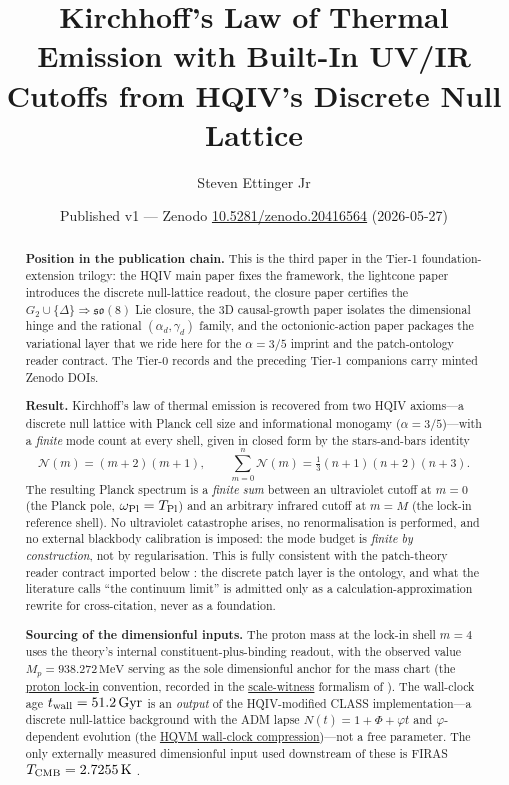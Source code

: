 \documentclass[11pt]{amsart}
\title[Finite-Mode Kirchhoff from HQIV]
{Kirchhoff's Law of Thermal Emission with Built-In UV/IR Cutoffs
from HQIV's Discrete Null Lattice}
\author{Steven Ettinger Jr}
\date{Published v1 --- Zenodo \href{https://doi.org/10.5281/zenodo.20416564}{10.5281/zenodo.20416564} (2026-05-27)}
\begin{document}
\begin{abstract}
\noindent\textbf{Position in the publication chain.}
This is the third paper in the Tier-1 foundation-extension trilogy:
the HQIV main paper \cite{ettinger2026hqiv} fixes the framework, the
lightcone paper \cite{hqiv-lightcone-paper} introduces the discrete
null-lattice readout, the closure paper \cite{hqiv-so8-paper}
certifies the $G_2\cup\{\Delta\}\Rightarrow\mathfrak{so}(8)$ Lie
closure, the 3D causal-growth paper \cite{hqiv-3d-growth-paper}
isolates the dimensional hinge and the rational \((\alpha_d,\gamma_d)\)
family, and the octonionic-action paper \cite{hqiv-oct-action-paper}
packages the variational layer that we ride here for the
$\alpha=3/5$ imprint and the patch-ontology reader contract. The
Tier-0 records and the preceding Tier-1 companions
\cite{hqiv-3d-growth-paper,hqiv-oct-action-paper} carry minted Zenodo DOIs.

\noindent\textbf{Result.}
Kirchhoff's law of thermal emission is recovered from two HQIV
axioms---a discrete null lattice with Planck cell size and
informational monogamy ($\alpha=3/5$)---with a \emph{finite} mode
count at every shell, given in closed form by the stars-and-bars
identity
\[
  \mathcal{N}(m)=(m+2)(m+1),
\qquad
  \sum_{m=0}^{n}\mathcal{N}(m)=\tfrac{1}{3}(n+1)(n+2)(n+3).
\]
The resulting Planck spectrum is a \emph{finite sum} between an
ultraviolet cutoff at $m=0$ (the Planck pole, $\omega_{\rm Pl}=T_{\rm Pl}$)
and an arbitrary infrared cutoff at $m=M$ (the lock-in reference
shell).  No ultraviolet catastrophe arises, no renormalisation is
performed, and no external blackbody calibration is imposed: the
mode budget is \emph{finite by construction}, not by regularisation.
This is fully consistent with the patch-theory reader contract
imported below \cite{hqiv-oct-action-paper}: the discrete patch
layer is the ontology, and what the literature calls ``the
continuum limit'' is admitted only as a calculation-approximation
rewrite for cross-citation, never as a foundation.

\noindent\textbf{Sourcing of the dimensionful inputs.}
The proton mass at the lock-in shell $m=4$ uses the theory's
internal constituent-plus-binding readout, with the observed
value $M_{p}=938.272\,\mathrm{MeV}$ serving as the
sole dimensionful anchor for the mass chart (the
\hyperref[lean:proton-lockin]{proton lock-in} convention, recorded in
the \hyperref[lean:scale-witness]{scale-witness} formalism of
\cite{hqiv-lean}).
The wall-clock age $t_{\rm wall}=51.2\,\mathrm{Gyr}$ is an
\emph{output} of the HQIV-modified CLASS implementation---a
discrete null-lattice background with the ADM lapse
$N(t)=1+\Phi+\varphi t$ and $\varphi$-dependent evolution (the
\hyperref[lean:wall-clock]{HQVM wall-clock compression})---not a
free parameter.  The only externally measured dimensionful input
used downstream of these is FIRAS $T_{\rm CMB}=2.7255\,\mathrm{K}$
\cite{fixsen2009}.


\end{abstract}
\end{document}
